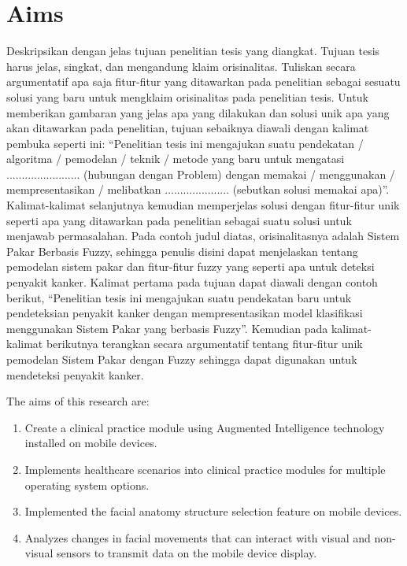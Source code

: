 \section{Aims}
Deskripsikan dengan jelas tujuan penelitian tesis yang diangkat. Tujuan tesis harus jelas, singkat, dan mengandung klaim orisinalitas. Tuliskan secara argumentatif apa saja fitur-fitur yang ditawarkan pada penelitian sebagai sesuatu solusi yang baru untuk mengklaim orisinalitas pada penelitian tesis. Untuk memberikan gambaran yang jelas apa yang dilakukan dan solusi unik apa yang akan ditawarkan pada penelitian, tujuan sebaiknya diawali dengan kalimat pembuka seperti ini: “Penelitian tesis ini mengajukan suatu pendekatan / algoritma / pemodelan / teknik / metode yang baru untuk mengatasi ........................ (hubungan dengan Problem) dengan memakai / menggunakan / mempresentasikan / melibatkan ..................... (sebutkan solusi memakai apa)”. Kalimat-kalimat selanjutnya kemudian memperjelas solusi dengan fitur-fitur unik seperti apa yang ditawarkan pada penelitian sebagai suatu solusi untuk menjawab permasalahan.
Pada contoh judul diatas, orisinalitasnya adalah Sistem Pakar Berbasis Fuzzy, sehingga penulis disini dapat menjelaskan tentang pemodelan sistem pakar dan fitur-fitur fuzzy yang seperti apa untuk deteksi penyakit kanker. Kalimat pertama pada tujuan dapat diawali dengan contoh berikut, “Penelitian tesis ini mengajukan suatu pendekatan baru untuk pendeteksian penyakit kanker dengan mempresentasikan model klasifikasi menggunakan Sistem Pakar yang berbasis Fuzzy”. Kemudian pada kalimat-kalimat berikutnya terangkan secara argumentatif tentang fitur-fitur unik pemodelan Sistem Pakar dengan Fuzzy sehingga dapat digunakan untuk mendeteksi penyakit kanker.

The aims of this research are:{\vspace{-2ex}}
\begin{enumerate}
       \item Create a clinical practice module using Augmented Intelligence technology installed on mobile devices.{\vspace{-2ex}}
       \item Implements healthcare scenarios into clinical practice modules for multiple operating system options. {\vspace{-2ex}}
       \item Implemented the facial anatomy structure selection feature on mobile devices.{\vspace{-2ex}}
       \item Analyzes changes in facial movements that can interact with visual and non-visual sensors to transmit data on the mobile device display.{\vspace{-2ex}}
\end{enumerate}

